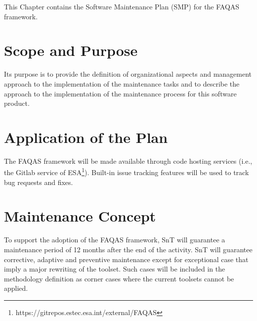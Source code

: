 
This Chapter contains the Software Maintenance Plan (SMP) for the FAQAS framework.

\section{Scope and Purpose}

Its purpose is to provide the definition of organizational aspects and management approach to the implementation of the maintenance tasks and to describe the approach to the implementation of the maintenance process for this software product.

\section{Application of the Plan}

 The FAQAS framework will be made available through code hosting services (i.e., the Gitlab service of ESA\footnote{https://gitrepos.estec.esa.int/external/FAQAS}). Built-in issue tracking features will be used to track bug requests and fixes.

\section{Maintenance Concept}

To support the adoption of the FAQAS framework, SnT will guarantee a maintenance period of 12 months after the end of the activity.
SnT will guarantee corrective, adaptive and preventive maintenance except for exceptional case that imply a major rewriting of the toolset.
Such cases will be included in the methodology definition as corner cases where the current toolsets cannot be applied.
